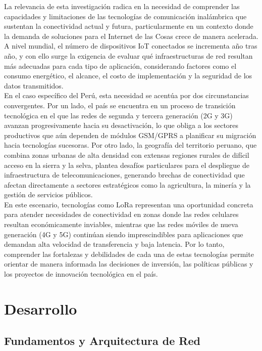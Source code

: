 \documentclass[12pt,a4paper]{article}
\begin{document}
	La relevancia de esta investigación radica en la necesidad de comprender las capacidades y limitaciones de las tecnologías de comunicación inalámbrica que sustentan la conectividad actual y futura, particularmente en un contexto donde la demanda de soluciones para el Internet de las Cosas crece de manera acelerada. A nivel mundial, el número de dispositivos IoT conectados se incrementa año tras año, y con ello surge la exigencia de evaluar qué infraestructuras de red resultan más adecuadas para cada tipo de aplicación, considerando factores como el consumo energético, el alcance, el costo de implementación y la seguridad de los datos transmitidos.\\

	En el caso específico del Perú, esta necesidad se acentúa por dos circunstancias convergentes. Por un lado, el país se encuentra en un proceso de transición tecnológica en el que las redes de segunda y tercera generación (2G y 3G) avanzan progresivamente hacia su desactivación, lo que obliga a los sectores productivos que aún dependen de módulos GSM/GPRS a planificar su migración hacia tecnologías sucesoras. Por otro lado, la geografía del territorio peruano, que combina zonas urbanas de alta densidad con extensas regiones rurales de difícil acceso en la sierra y la selva, plantea desafíos particulares para el despliegue de infraestructura de telecomunicaciones, generando brechas de conectividad que afectan directamente a sectores estratégicos como la agricultura, la minería y la gestión de servicios públicos.\\

	En este escenario, tecnologías como LoRa representan una oportunidad concreta para atender necesidades de conectividad en zonas donde las redes celulares resultan económicamente inviables, mientras que las redes móviles de nueva generación (4G y 5G) continúan siendo imprescindibles para aplicaciones que demandan alta velocidad de transferencia y baja latencia. Por lo tanto, comprender las fortalezas y debilidades de cada una de estas tecnologías permite orientar de manera informada las decisiones de inversión, las políticas públicas y los proyectos de innovación tecnológica en el país.

	\pagebreak
	
	\section{Desarrollo}
	\subsection{Fundamentos y Arquitectura de Red}
\end{document}
